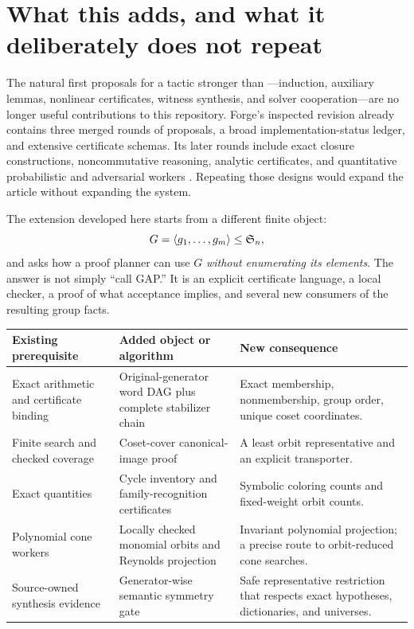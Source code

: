 \section{What this adds, and what it deliberately does not repeat}
\label{sec:scope}
The natural first proposals for a tactic stronger than ---induction, auxiliary lemmas, nonlinear certificates, witness synthesis, and solver cooperation---are no longer useful contributions to this repository. Forge's inspected revision already contains three merged rounds of proposals, a broad implementation-status ledger, and extensive certificate schemas. Its later rounds include exact closure constructions, noncommutative reasoning, analytic certificates, and quantitative probabilistic and adversarial workers \cite{forge-readme,forge-status,forge-schemas}. Repeating those designs would expand the article without expanding the system.

The extension developed here starts from a different finite object:
\[
  G=\langle g_1,\ldots,g_m\rangle\leq\mathfrak S_n,
\]
and asks how a proof planner can use $G$ \emph{without enumerating its elements}. The answer is not simply ``call GAP.'' It is an explicit certificate language, a local checker, a proof of what acceptance implies, and several new consumers of the resulting group facts.

\begin{tabularx}{\textwidth}{@{}p{}YY@{}}
\toprule
Existing prerequisite & Added object or algorithm & New consequence\\
\midrule
Exact arithmetic and certificate binding & Original-generator word DAG plus complete stabilizer chain & Exact membership, nonmembership, group order, unique coset coordinates.\\
Finite search and checked coverage & Coset-cover canonical-image proof & A least orbit representative and an explicit transporter.\\
Exact quantities & Cycle inventory and family-recognition certificates & Symbolic coloring counts and fixed-weight orbit counts.\\
Polynomial cone workers & Locally checked monomial orbits and Reynolds projection & Invariant polynomial projection; a precise route to orbit-reduced cone searches.\\
Source-owned synthesis evidence & Generator-wise semantic symmetry gate & Safe representative restriction that respects exact hypotheses, dictionaries, and universes.\\
\bottomrule
\end{tabularx}

